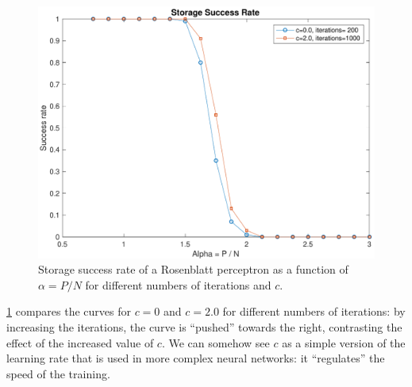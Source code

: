 \begin{figure}[t]
	\centering
	\includegraphics[width=\columnwidth]{figures/bonus_2_c_epoch}
    \caption{Storage success rate of a Rosenblatt perceptron as a function of $\alpha = P / N$ for different numbers of iterations and $c$.}
	\label{fig:multiple_c_multiple_epoch}
\end{figure}
\cref{fig:multiple_c_multiple_epoch} compares the curves for $c = 0$ and $c = 2.0$ for different numbers of iterations:
by increasing the iterations, the curve is ``pushed'' towards the right, contrasting the effect of the increased value of $c$.
We can somehow see $c$ as a simple version of the learning rate that is used in more complex neural networks: it ``regulates'' the speed of the training.

